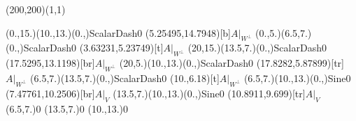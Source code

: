 \unitlength=1bp%

\begin{feynartspicture}(200,200)(1,1)

\FADiagram{}
\FAProp(0.,15.)(10.,13.)(0.,){ScalarDash}{0}
\FALabel(5.25495,14.7948)[b]{$A|_{W^\perp}$}
\FAProp(0.,5.)(6.5,7.)(0.,){ScalarDash}{0}
\FALabel(3.63231,5.23749)[t]{$A|_{W^\perp}$}
\FAProp(20,15.)(13.5,7.)(0.,){ScalarDash}{0}
\FALabel(17.5295,13.1198)[br]{$A|_{W^\perp}$}
\FAProp(20,5.)(10.,13.)(0.,){ScalarDash}{0}
\FALabel(17.8282,5.87899)[tr]{$A|_{W^\perp}$}
\FAProp(6.5,7.)(13.5,7.)(0.,){ScalarDash}{0}
\FALabel(10.,6.18)[t]{$A|_{W^\perp}$}
\FAProp(6.5,7.)(10.,13.)(0.,){Sine}{0}
\FALabel(7.47761,10.2506)[br]{$A|_V$}
\FAProp(13.5,7.)(10.,13.)(0.,){Sine}{0}
\FALabel(10.8911,9.699)[tr]{$A|_V$}
\FAVert(6.5,7.){0}
\FAVert(13.5,7.){0}
\FAVert(10.,13.){0}
\end{feynartspicture}

